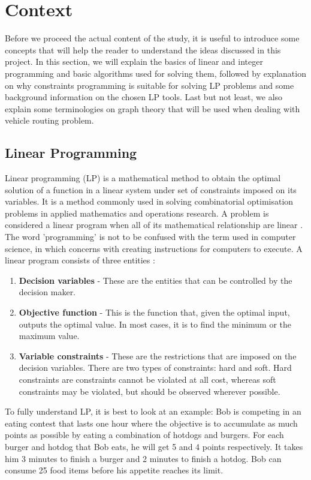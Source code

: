 \chapter{Context}
Before we proceed the actual content of the study, it is useful to introduce some concepts that will help the reader
to understand the ideas discussed in this project. In this section, we will explain the basics of
linear and integer programming and basic algorithms used for solving them, followed by explanation on why
constraints programming is suitable for solving LP problems and some background information on the chosen LP tools. Last but not least,
we also explain some terminologies on graph theory that will be used when dealing with vehicle routing problem.

\section{Linear Programming}
Linear programming (LP) is a mathematical method to obtain the optimal solution of a function in a linear system under set of constraints
imposed on its variables. It is a method commonly used in solving combinatorial optimisation problems in applied mathematics and operations research.
A problem is considered a linear program when all of its mathematical relationship are linear \cite{APMBradley}.
The word 'programming' is not to be confused with the term used in computer science,
in which concerns with creating instructions for computers to execute. A linear
program consists of three entities \cite{LPChvatal,ILPCoursera}:
\begin{enumerate}
\item \textbf{Decision variables} - These are the entities that can be controlled by the decision maker.
\item \textbf{Objective function} - This is the function that, given the optimal input, outputs the optimal value.
In most cases, it is to find the minimum or the maximum value.
\item \textbf{Variable constraints} - These are the restrictions that are imposed on the decision variables. There are two types
of constraints: hard and soft. Hard constraints are constraints cannot be violated at all cost, whereas soft constraints may be
violated, but should be observed wherever possible.
\end{enumerate}

To fully understand LP, it is best to look at an example: Bob is competing in
an eating contest that lasts one hour where the objective is to accumulate as much points as possible by eating a combination of hotdogs and burgers.
For each burger and hotdog that Bob eats, he will get 5 and 4 points respectively. It takes him 3 minutes to finish a burger and
2 minutes to finish a hotdog. Bob can consume 25 food items before his appetite reaches its limit.

